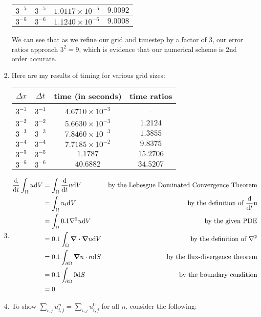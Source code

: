\documentclass{article} %
\theoremstyle{plain}
\newcommand{\Dx}{\Delta x}
\newcommand{\Dt}{\Delta t}
\numberwithin{equation}{section} %
\numberwithin{figure}{section} %
\numberwithin{table}{section} %
\begin{document}
\begin{enumerate}[\ \ (a)]
\begin{table}[ht!]
\begin{tabular}{||c|c|c|c||}
            $3^{-5}$ & $3^{-5}$ & $1.0117\times10^{-5}$ & $9.0092$ \\\hline
            $3^{-6}$ & $3^{-6}$ & $1.1240\times10^{-6}$ & $9.0008$ \\\hline\hline
            \end{tabular}
        \end{table}
        \FloatBarrier
        We can see that as we refine our grid and timestep by a factor of $3$, our error ratios approach $3^2 = 9$, which is evidence that our numerical scheme is 2nd order accurate.
    \item
        Here are my results of timing for various grid sizes:
        \begin{table}[ht!]
            \centering
            \begin{tabular}{||c|c|c|c||}\hline\hline
                $\Dx$ & $\Dt$ & time (in seconds) & time ratios \\\hline\hline
                $3^{-1}$ & $3^{-1}$ & $4.6710\times10^{-3}$ & - \\\hline
                $3^{-2}$ & $3^{-2}$ & $5.6630\times10^{-3}$ & $1.2124$ \\\hline
                $3^{-3}$ & $3^{-3}$ & $7.8460\times10^{-3}$ & $1.3855$ \\\hline
                $3^{-4}$ & $3^{-4}$ & $7.7185\times10^{-2}$ & $9.8375$ \\\hline
                $3^{-5}$ & $3^{-5}$ & $1.1787$ & $15.2706$ \\\hline
                $3^{-6}$ & $3^{-6}$ & $40.6882$ & $34.5207$ \\\hline\hline
            \end{tabular}
        \end{table}
        \FloatBarrier
    \item
        \begin{align*}
            \frac{\dd}{\dd t}\int_\Omega u \dd V &= \int_\Omega \frac{\dd}{\dd t}u \dd V & \text{by the Lebesgue Dominated Convergence Theorem}\\
            &= \int_\Omega u_t\dd V & \text{by the definition of $\frac{\dd}{\dd t}$u} \\
            &= \int_\Omega0.1\laplacian u \dd V & \text{by the given PDE}\\
            &= 0.1\int_\Omega\div\grad u \dd V & \text{by the definition of $\laplacian$} \\
            &= 0.1\int_{\partial \Omega}\grad u\cdot n\dd S & \text{by the flux-divergence theorem}\\
            &= 0.1\int_{\partial \Omega}0\dd S & \text{by the boundary condition}\\
            &= 0
        \end{align*}
    \item
        To show $\sum_{i,j}u_{i,j}^n = \sum_{i,j}u_{i,j}^0$ for all $n$, consider the following:\vspace{0.5cm}


\end{enumerate}
\end{document}

